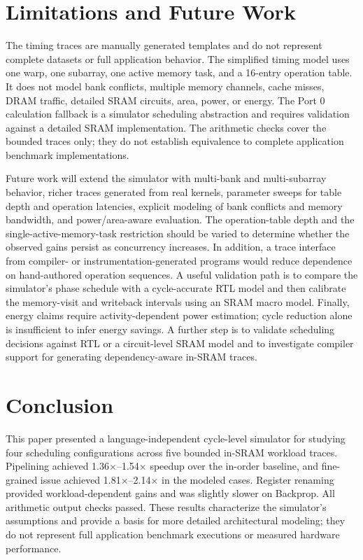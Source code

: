 \documentclass[conference]{IEEEtran}
\begin{document}
\section{Limitations and Future Work}
The timing traces are manually generated templates and do not represent complete datasets or full application behavior. The simplified timing model uses one warp, one subarray, one active memory task, and a 16-entry operation table. It does not model bank conflicts, multiple memory channels, cache misses, DRAM traffic, detailed SRAM circuits, area, power, or energy. The Port 0 calculation fallback is a simulator scheduling abstraction and requires validation against a detailed SRAM implementation. The arithmetic checks cover the bounded traces only; they do not establish equivalence to complete application benchmark implementations.

Future work will extend the simulator with multi-bank and multi-subarray behavior, richer traces generated from real kernels, parameter sweeps for table depth and operation latencies, explicit modeling of bank conflicts and memory bandwidth, and power/area-aware evaluation. The operation-table depth and the single-active-memory-task restriction should be varied to determine whether the observed gains persist as concurrency increases. In addition, a trace interface from compiler- or instrumentation-generated programs would reduce dependence on hand-authored operation sequences. A useful validation path is to compare the simulator's phase schedule with a cycle-accurate RTL model and then calibrate the memory-visit and writeback intervals using an SRAM macro model. Finally, energy claims require activity-dependent power estimation; cycle reduction alone is insufficient to infer energy savings. A further step is to validate scheduling decisions against RTL or a circuit-level SRAM model and to investigate compiler support for generating dependency-aware in-SRAM traces.

\section{Conclusion}
This paper presented a language-independent cycle-level simulator for studying four scheduling configurations across five bounded in-SRAM workload traces. Pipelining achieved 1.36$\times$--1.54$\times$ speedup over the in-order baseline, and fine-grained issue achieved 1.81$\times$--2.14$\times$ in the modeled cases. Register renaming provided workload-dependent gains and was slightly slower on Backprop. All arithmetic output checks passed. These results characterize the simulator's assumptions and provide a basis for more detailed architectural modeling; they do not represent full application benchmark executions or measured hardware performance.
\end{document}
